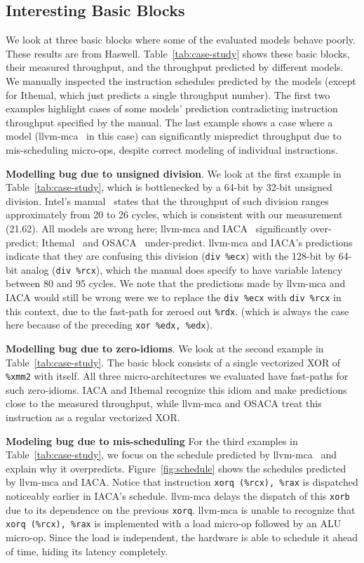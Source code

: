 \subsection{Interesting Basic Blocks}
We look at three basic blocks where some of the evaluated models behave poorly.
These results are from Haswell.
Table~\ref{tab:case-study} shows these basic blocks, their 
measured throughput, and the throughput predicted by different models.
We manually inspected the instruction schedules predicted by the models
(except for Ithemal, which just predicts a single throughput number).
The first two examples highlight cases of some models' prediction
contradicting instruction throughput specified by the manual.
The last example shows a case where a model (llvm-mca~\cite{llvm-mca} in this case) can significantly
mispredict throughput due to mis-scheduling micro-ops, despite correct modeling of individual instructions.

\textbf{Modelling bug due to unsigned division}.
We look at the first example in Table~\ref{tab:case-study},
which is bottlenecked by a 64-bit by 32-bit unsigned division.
Intel's manual~\cite{intel-manual} states that the throughput of such division
ranges approximately from 20 to 26 cycles, which is consistent with our measurement (21.62).
All models are wrong here; llvm-mca and IACA~\cite{iaca} significantly over-predict;
Ithemal~\cite{ithemal} and OSACA~\cite{osaca} under-predict.
llvm-mca and IACA's predictions indicate that they are confusing 
this division (\verb|div %ecx|) with the 128-bit by 64-bit analog (\verb|div %rcx|),
which the manual does specify to have variable latency between 80 and 95 cycles.
We note that the predictions made by llvm-mca and IACA would still be wrong
were we to replace the \verb|div %ecx| with \verb|div %rcx| in this context,
due to the fast-path for zeroed out \verb|%rdx|.
(which is always the case here because of the preceding \verb|xor %edx, %edx|).

\textbf{Modelling bug due to zero-idioms}.
We look at the second example in Table~\ref{tab:case-study}.
The basic block consists of a single vectorized XOR of \verb|%xmm2| with itself.
All three micro-architectures we evaluated have fast-paths for such zero-idioms. 
IACA and Ithemal recognize this idiom and make predictions close to the measured throughput,
while llvm-mca and OSACA treat this instruction as a regular vectorized XOR.

\textbf{Modeling bug due to mis-scheduling}
For the third examples in Table~\ref{tab:case-study}, 
we focus on the schedule predicted by llvm-mca~\cite{llvm-mca}
and explain why it overpredicts.
Figure~\ref{fig:schedule} shows the schedules predicted by llvm-mca and IACA.
Notice that instruction \verb|xorq (%rcx), %rax| is dispatched
noticeably earlier in IACA's schedule.
llvm-mca delays the dispatch of this \verb|xorb| due to its dependence on the previous \verb|xorq|.
llvm-mca is unable to recognize that 
\verb|xorq (%rcx), %rax| is implemented with a load micro-op followed by an ALU micro-op.
Since the load is independent, the hardware is able to schedule it ahead of time,
hiding its latency completely.

